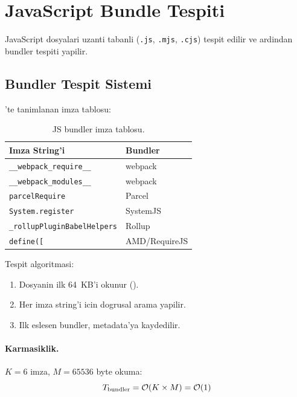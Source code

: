 \section{JavaScript Bundle Tespiti}
\label{sec:js-detection}

JavaScript dosyalari uzanti tabanli (\texttt{.js}, \texttt{.mjs}, \texttt{.cjs}) tespit edilir ve ardindan bundler tespiti yapilir.

\subsection{Bundler Tespit Sistemi}

'te tanimlanan imza tablosu:

\begin{table}[htbp]
\centering
\begin{tabular}{ll}
\toprule
\textbf{\color{sectioncyan}Imza String'i} & \textbf{\color{sectioncyan}Bundler} \\
\midrule
\texttt{\_\_webpack\_require\_\_} & webpack \\
\texttt{\_\_webpack\_modules\_\_} & webpack \\
\texttt{parcelRequire}            & Parcel \\
\texttt{System.register}          & SystemJS \\
\texttt{\_rollupPluginBabelHelpers} & Rollup \\
\texttt{define([}                  & AMD/RequireJS \\
\bottomrule
\end{tabular}
\caption{JS bundler imza tablosu.}
\label{tab:js-bundlers}
\end{table}

Tespit algoritmasi:
\begin{enumerate}
\item Dosyanin ilk 64~KB'i okunur ().
\item Her imza string'i icin dogrusal arama yapilir.
\item Ilk eslesen bundler, metadata'ya kaydedilir.
\end{enumerate}

\paragraph{Karmasiklik.} $K = 6$ imza, $M = 65536$ byte okuma:
\begin{equation}
\label{eq:bundler-complexity}
T_{\text{bundler}} = \mathcal{O}\!\left(K \times M\right) = \mathcal{O}\!\left(1\right)
\end{equation}


